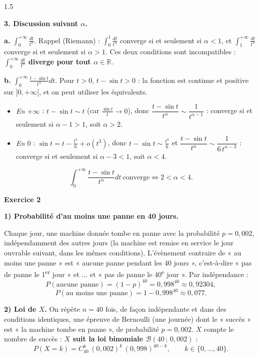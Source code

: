 \documentclass[12pt]{article}
\begin{document}
\begin{spacing}{1.5}

\textbf{3. Discussion suivant $\alpha$.}

\textbf{a.} $\displaystyle\int_0^{+\infty}\frac{dt}{t^\alpha}$. Rappel (Riemann) : $\int_0^1\frac{dt}{t^\alpha}$ converge si et seulement si $\alpha<1$, et $\int_1^{+\infty}\frac{dt}{t^\alpha}$ converge si et seulement si $\alpha>1$. Ces deux conditions sont incompatibles : \textbf{$\int_0^{+\infty}\frac{dt}{t^\alpha}$ diverge pour tout $\alpha\in\mathbb{R}$}.

\textbf{b.} $\displaystyle\int_0^{+\infty}\frac{t-\sin t}{t^\alpha}dt$. Pour $t>0$, $t-\sin t>0$ : la fonction est continue et positive sur $]0,+\infty[$, et on peut utiliser les équivalents.
\begin{itemize}
\item \emph{En $+\infty$} : $t-\sin t\sim t$ (car $\frac{\sin t}{t}\to0$), donc $\dfrac{t-\sin t}{t^\alpha}\sim\dfrac1{t^{\alpha-1}}$ : converge si et seulement si $\alpha-1>1$, soit $\alpha>2$.
\item \emph{En $0$} : $\sin t=t-\frac{t^3}{6}+o(t^3)$, donc $t-\sin t\sim\frac{t^3}{6}$ et $\dfrac{t-\sin t}{t^\alpha}\sim\dfrac{1}{6\,t^{\alpha-3}}$ : converge si et seulement si $\alpha-3<1$, soit $\alpha<4$.
\end{itemize}
\[
\boxed{\int_0^{+\infty}\frac{t-\sin t}{t^\alpha}dt\ \text{converge}\iff2<\alpha<4}.
\]

\medskip\textbf{Exercice 2}

\textbf{1) Probabilité d'au moins une panne en 40 jours.}

Chaque jour, une machine donnée tombe en panne avec la probabilité $p=0{,}002$, indépendamment des autres jours (la machine est remise en service le jour ouvrable suivant, dans les mêmes conditions). L'évènement contraire de « au moins une panne » est « aucune panne pendant les 40 jours », c'est-à-dire « pas de panne le 1\textsuperscript{er} jour » et ... et « pas de panne le 40\textsuperscript{e} jour ». Par indépendance :
\[
P(\text{aucune panne})=(1-p)^{40}=0{,}998^{40}\approx0{,}92304,
\]
\[
P(\text{au moins une panne})=1-0{,}998^{40}\approx\boxed{0{,}077}.
\]

\textbf{2) Loi de $X$.} On répète $n=40$ fois, de façon indépendante et dans des conditions identiques, une épreuve de Bernoulli (une journée) dont le « succès » est « la machine tombe en panne », de probabilité $p=0{,}002$. $X$ compte le nombre de succès : \textbf{$X$ suit la loi binomiale $\mathcal{B}(40\,;\,0{,}002)$} :
\[
P(X=k)=C_{40}^k\,(0{,}002)^k\,(0{,}998)^{40-k},\qquad k\in\{0,\dots,40\}.
\]


\end{spacing}
\end{document}
